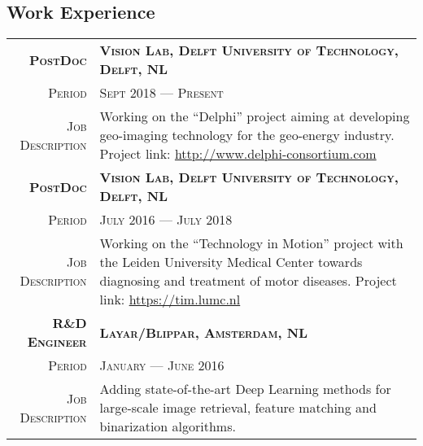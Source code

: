 \documentclass[a4paper, oneside, final]{scrartcl}
\newcommand{\gray}{\rowcolor[gray]{.90}}
\begin{document}
\begin{center}
		\section{Work Experience}
		\begin{tabular}{r@{\hskip 0.3in}p{13.3cm}}
			\gray \textsc{\textbf{PostDoc}}     & \textsc{\textbf{Vision Lab, Delft University of Technology, Delft, NL}}\\
			\textsc{Period}                     & \textsc{Sept 2018 --- Present} \\
			\textsc{Job Description}    & 
				Working on the ``Delphi'' project aiming at developing geo-imaging technology for the geo-energy industry. 
				Project link: \href{http://www.delphi-consortium.com}{http://www.delphi-consortium.com}
            \vspace{5px}\\
			\gray \textsc{\textbf{PostDoc}}     & \textsc{\textbf{Vision Lab, Delft University of Technology, Delft, NL}}\\
			\textsc{Period}                     & \textsc{July 2016 --- July 2018} \\
			\textsc{Job Description}            & Working on the ``Technology in Motion'' project with the Leiden University Medical Center 
				towards diagnosing and treatment of motor diseases.
				Project link: \href{https://tim.lumc.nl}{https://tim.lumc.nl}
            \vspace{5px}\\
			\gray \textsc{\textbf{R\&D Engineer}}   & \textsc{\textbf{Layar\slash Blippar, Amsterdam, NL}}\\
			\textsc{Period}                         & \textsc{January --- June 2016} \\
			\textsc{Job Description}                &  Adding state-of-the-art Deep Learning methods for large-scale image retrieval, 
				feature matching and binarization algorithms.\\
		\end{tabular}


\end{center}
\end{document}
